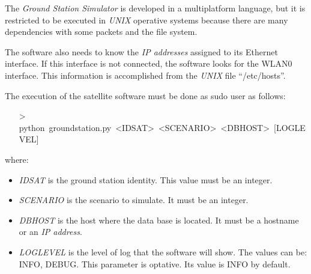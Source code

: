 The \emph{Ground Station Simulator} is developed in a multiplatform language, but it is restricted to be executed in \emph{UNIX} operative systems because there are many dependencies with some packets and the file system.

The software also needs to know the \emph{IP addresses} assigned to its Ethernet interface. If this interface is not connected, the software looks for the WLAN0 interface. This information is accomplished from the \emph{UNIX} file ``/etc/hosts''.

The execution of the satellite software must be done as sudo user as follows:
\begin{itemize}
\item[>]python~groundstation.py~<IDSAT>~<SCENARIO>~<DBHOST>~[LOGLEVEL]
\end{itemize}

where:
\begin{itemize}
\item \emph{IDSAT} is the ground station identity. This value must be an integer.
\item \emph{SCENARIO} is the scenario to simulate. It must be an integer.
\item \emph{DBHOST} is the host where the data base is located. It must be a hostname or an \emph{IP address}.
\item \emph{LOGLEVEL} is the level of log that the software will show. The
  values can be: INFO, DEBUG. This parameter is optative. Its value is INFO by default.
\end{itemize}
